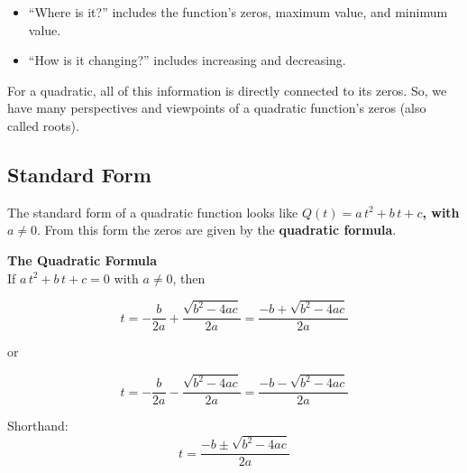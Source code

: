 \documentclass{ximera}
\begin{document}
\begin{itemize}
\item ``Where is it?'' includes the function's zeros, maximum value, and minimum value.
\item ``How is it changing?'' includes increasing and decreasing.
\end{itemize}



For a quadratic, all of this information is directly connected to its zeros.  So, we have many perspectives and viewpoints of a quadratic function's zeros (also called roots).





\subsection*{Standard Form}






The standard form of a quadratic function looks like \textbf{$Q(t) = a \, t^2 + b \, t + c$, with $a \ne 0$}.  From this form the zeros are given by the \textbf{quadratic formula}.





\begin{definition} \textbf{\textcolor{green!50!black}{The Quadratic Formula}} \\



If $a \, t^2 + b \, t + c = 0$ with $a \ne 0$, then


\[ t   = - \frac{b}{2 a} + \frac{\sqrt{b^2 - 4 a c}}{2a}  = \frac{-b + \sqrt{b^2 - 4 a c}}{2a}      \]

or

\[ t  = - \frac{b}{2 a}  -\frac{\sqrt{b^2 - 4 a c}}{2a} =    \frac{-b - \sqrt{b^2 - 4 a c}}{2a}      \]



Shorthand: 
\[ t  =   \frac{-b \pm \sqrt{b^2 - 4 a c}}{2a}      \]


\end{definition}
\end{document}
